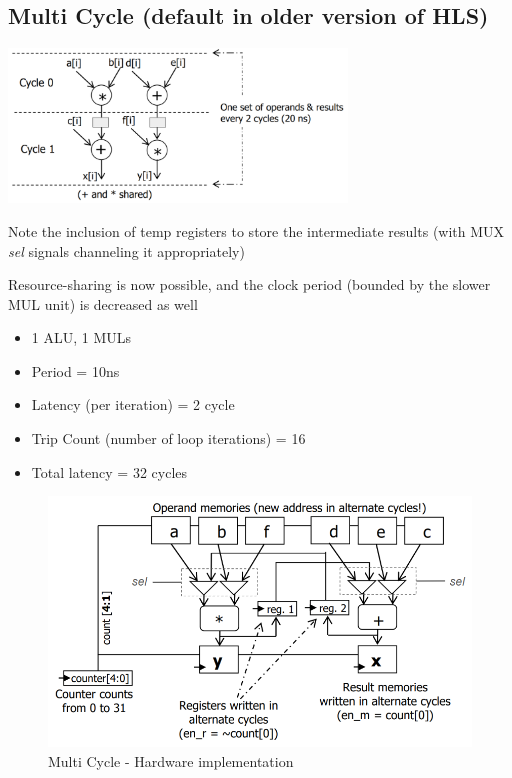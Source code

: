 \documentclass{article}
\begin{document}
\subsection{Multi Cycle (default in older version of HLS)}

\begin{minipage}[t]{0.5\textwidth}
    \vspace{0pt}
    \includegraphics[width=9cm, scale=1]{S1/multiCycle_scheduling.PNG}
\end{minipage}%
\begin{minipage}[t]{0.5\textwidth}
    \vspace{0pt}
    Note the inclusion of temp registers to store the intermediate results (with MUX \textit{sel} signals channeling it appropriately) \newline

    Resource-sharing is now possible, and the clock period (bounded by the slower MUL unit) is decreased as well \newline

    \begin{itemize}
        \item 1 ALU, 1 MULs
        \item Period = 10ns
        \item Latency (per iteration) = 2 cycle
        \item Trip Count (number of loop iterations) = 16
        \item Total latency = 32 cycles
    \end{itemize}
\end{minipage}

\begin{figure}[htp]
    \centering
    \includegraphics[width=12cm, scale=1]{S1/multiCycle_hardware.PNG}
    \caption{Multi Cycle - Hardware implementation}
\end{figure}
\end{document}
